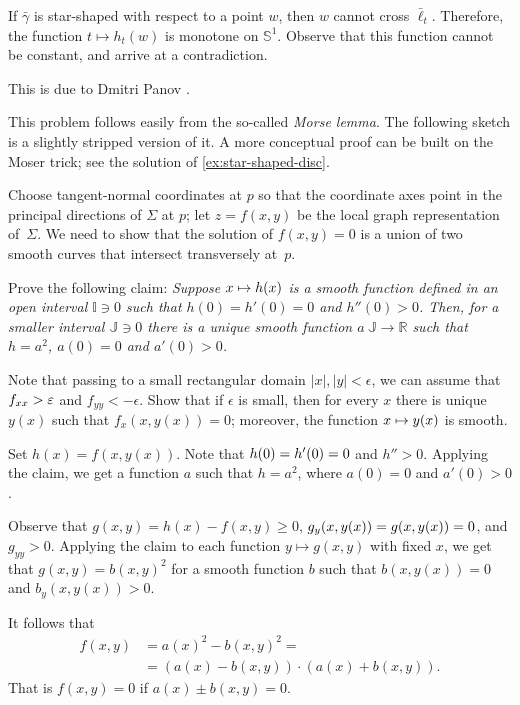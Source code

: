 \begin{multicols}{2}
If $\bar\gamma$ is star-shaped with respect to a point $w$, then $w$ cannot cross $\bar\ell_t$.
Therefore, the function $t\mapsto h_t(w)$ is monotone on $\mathbb{S}^1$.
Observe that this function cannot be constant, and arrive at a contradiction.

This is due to Dmitri Panov \cite{panov-curves}.

This problem follows easily from the so-called \emph{Morse lemma}.
The following sketch is a slightly stripped version of it.
A more conceptual proof \cite{palais} can be built on the Moser trick; see the solution of \ref{ex:star-shaped-disc}.

\medskip

Choose tangent-normal coordinates at $p$ so that the coordinate axes point in the principal directions of $\Sigma$ at $p$;
let $z=f(x,y)$ be the local graph representation of~$\Sigma$.
We need to show that the solution of $f(x,y)=0$ is a union of two smooth curves that intersect transversely at~$p$.

Prove the following claim:
\textit{Suppose $x\z\mapsto h(x)$ is a smooth function defined in an open interval $\mathbb{I}\ni0$ such that $h(0)=h'(0)=0$ and $h''(0)>0$.
Then, for a smaller interval $\mathbb{J}\ni0$ there is a unique smooth function $a\:\mathbb{J}\to\mathbb{R}$ such that $h=a^2$, $a(0)=0$ and $a'(0)> 0$.}

Note that passing to a small rectangular domain $|x|,|y|<\epsilon$, we can assume that $f_{xx}\z>\epsilon$ and $f_{yy}<-\epsilon$. 
Show that if $\epsilon$ is small, then for every $x$ there is unique $y(x)$ such that $f_x(x,y(x))=0$; 
moreover, the function $x\z\mapsto y(x)$ is smooth.

Set $h(x)=f(x,y(x))$.
Note that $h(0)\z=h'(0)=0$ and $h''>0$.
Applying the claim, we get a function $a$ such that $h=a^2$, where $a(0)=0$ and $a'(0)>0$.

Observe that $g(x,y)=h(x)-f(x,y)\ge 0$, $g_y(x,y(x))\z=g(x,y(x))\z=0$, and $g_{yy}>0$.
Applying the claim to each function $y\mapsto g(x,y)$ with fixed $x$, we get that $g(x,y)=b(x,y)^2$ for a smooth function $b$ such that 
$b(x,y(x))=0$ and $b_y(x,y(x))>0$.

It follows that 
\begin{align*}
f(x,y)&=a(x)^2-b(x,y)^2=
\\
&=
(a(x)-b(x,y))\cdot (a(x)+b(x,y)).
\end{align*}
That is $f(x,y)=0$ if $a(x)\pm b(x,y) =0$.


\end{multicols}
